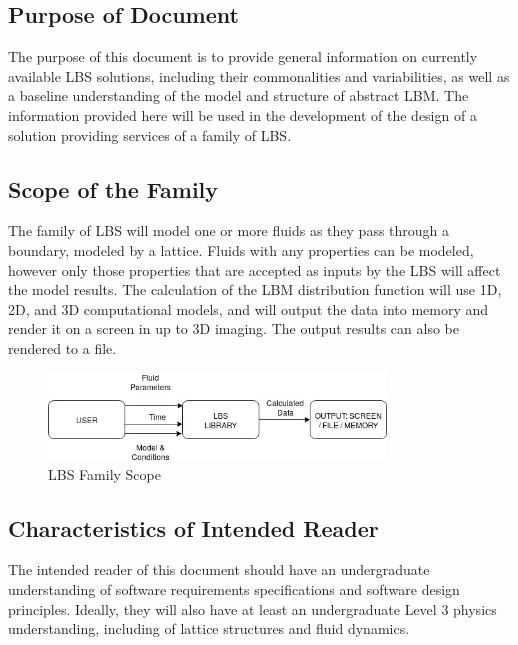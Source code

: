 \documentclass[12pt]{article}
\begin{document}
\subsection{Purpose of Document}

The purpose of this document is to provide general information on currently available LBS solutions, including their commonalities and variabilities, as well as a baseline understanding of the model and structure of abstract LBM. The information provided here will be used in the development of the design of a solution providing services of a family of LBS.

\subsection{Scope of the Family} 

The family of LBS will model one or more fluids as they pass through a boundary, modeled by a lattice. Fluids with any properties can be modeled, however only those properties that are accepted as inputs by the LBS will affect the model results. The calculation of the LBM distribution function will use 1D, 2D, and 3D computational models, and will output the data into memory and render it on a screen in up to 3D imaging. The output results can also be rendered to a file.\\

\begin{figure}[h!]
\begin{center}
\includegraphics[width=0.8\textwidth]{SystemContext}
\caption{LBS Family Scope}
\label{Fig_SystemContext}
\end{center}
\end{figure}

\subsection{Characteristics of Intended Reader} 

The intended reader of this document should have an undergraduate understanding of software requirements specifications and software design principles. Ideally, they will also have at least an undergraduate Level 3 physics understanding, including of lattice structures and fluid dynamics.
\end{document}

